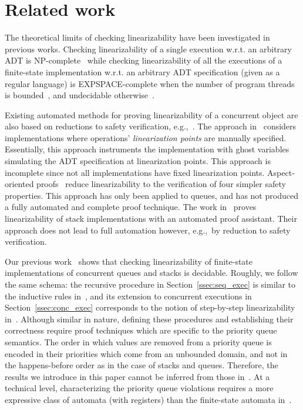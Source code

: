 \documentclass[a4paper,UKenglish]{lipics-v2016}
\begin{document}
 
\section{Related work}\label{sec:related}

The theoretical limits of checking linearizability have been investigated in previous works. 
Checking linearizability of a single execution w.r.t. an arbitrary ADT is NP-complete~\cite{journals/siamcomp/GibbonsK97} while checking linearizability of all the executions  
of a finite-state implementation w.r.t. an arbitrary ADT 
specification (given as a regular language) is EXPSPACE-complete when the number of program 
threads is bounded~\cite{journals/iandc/AlurMP00,netys-lin}, and
undecidable otherwise~\cite{conf/esop/BouajjaniEEH13}. 

Existing automated methods for proving linearizability of a concurrent object
 are also based on reductions to safety
verification, e.g.,~\cite{conf/tacas/AbdullaHHJR13, conf/concur/HenzingerSV13,
conf/cav/Vafeiadis10}. The approach in~\cite{conf/cav/Vafeiadis10} considers
implementations where 
operations' \emph{linearization points}
are 
manually specified.
Essentially, this approach instruments the
implementation with ghost variables simulating the ADT specification at
linearization points. This approach is incomplete since not all implementations
have fixed linearization points. Aspect-oriented
proofs~\cite{conf/concur/HenzingerSV13} reduce linearizability to the
verification of four simpler safety properties. This approach has only
been applied to queues, and has not produced a fully automated
and complete proof technique. The work in~\cite{Dodds:2015:SCT:2676726.2676963} proves 
linearizability of stack implementations with an automated proof assistant. 
Their approach does not lead to full automation however, e.g.,~by reduction to 
safety verification.

Our previous work~\cite{DBLP:conf/icalp/BouajjaniEEH15}
shows that checking linearizability of finite-state implementations of concurrent queues and stacks is decidable.
Roughly, we follow the same schema: the recursive procedure in Section~\ref{ssec:seq_exec} is similar to the inductive rules in~\cite{DBLP:conf/icalp/BouajjaniEEH15}, and its extension to concurrent executions in Section~\ref{ssec:conc_exec} corresponds to the notion of step-by-step linearizability in~\cite{DBLP:conf/icalp/BouajjaniEEH15}. Although similar in nature, defining these procedures and establishing their correctness require proof techniques which are specific to the priority queue semantics. The order in which values are removed from a priority queue is encoded in their priorities which come from an unbounded domain, and not in the happens-before order as in the case of stacks and queues. Therefore, the results we introduce in this paper cannot be inferred from those in~\cite{DBLP:conf/icalp/BouajjaniEEH15}. At a technical level, characterizing the priority queue violations requires a more expressive class of automata (with registers) than the finite-state automata in~\cite{DBLP:conf/icalp/BouajjaniEEH15}.


 

\newpage


  



\newpage

\appendix
\end{document}
